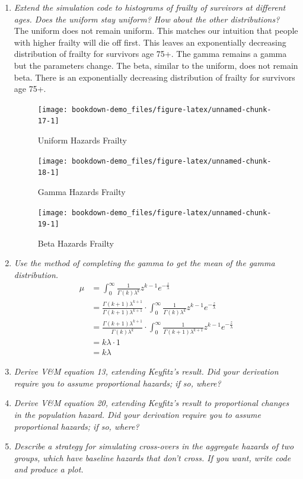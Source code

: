 \documentclass[]{book}
\providecommand{\tightlist}{%
  \setlength{\itemsep}{0pt}\setlength{\parskip}{0pt}}
\begin{document}
\begin{enumerate}
\def\labelenumi{\arabic{enumi}.}
\setcounter{enumi}{7}
\tightlist
\item
  \emph{Extend the simulation code to histograms of frailty of survivors at different ages. Does the uniform stay uniform? How about the other distributions?}\\
  The uniform does not remain uniform. This matches our intuition that people with higher frailty will die off first. This leaves an exponentially decreasing distribution of frailty for survivors age 75+. The gamma remains a gamma but the parameters change. The beta, similar to the uniform, does not remain beta. There is an exponentially decreasing distribution of frailty for survivors age 75+.

  \begin{figure}
  \texttt{[image: bookdown-demo\_files/figure-latex/unnamed-chunk-17-1]} \caption{Uniform Hazards Frailty}\label{fig:unnamed-chunk-17}
  \end{figure}
  \begin{figure}
  \texttt{[image: bookdown-demo\_files/figure-latex/unnamed-chunk-18-1]} \caption{Gamma Hazards Frailty}\label{fig:unnamed-chunk-18}
  \end{figure}
  \begin{figure}
  \texttt{[image: bookdown-demo\_files/figure-latex/unnamed-chunk-19-1]} \caption{Beta Hazards Frailty}\label{fig:unnamed-chunk-19}
  \end{figure}
\item
  \emph{Use the method of completing the gamma to get the mean of the gamma distribution.}\\
  \[\begin{aligned}
  \mu 
  & = \int_0^{\infty} \frac{1}{\Gamma(k) \lambda^k} z^{k - 1} e^{-\frac{z}{\lambda}} \\
  & = \frac{\Gamma(k+1) \lambda^{k+1}}{\Gamma(k+1) \lambda^{k+1}} \cdot \int_0^{\infty} \frac{1}{\Gamma(k) \lambda^k} z^{k - 1} e^{-\frac{z}{\lambda}} \\
  & = \frac{\Gamma(k+1) \lambda^{k+1}}{\Gamma(k) \lambda^{k}} \cdot \int_0^{\infty} \frac{1}{\Gamma(k+1) \lambda^{k+1}} z^{k - 1} e^{-\frac{z}{\lambda}} \\ 
  & = k \lambda \cdot 1 \\
  & = k \lambda
  \end{aligned}\]
\item
  \emph{Derive V\&M equation 13, extending Keyfitz's result. Did your derivation require you to assume proportional hazards; if so, where?}\\
\item
  \emph{Derive V\&M equation 20, extending Keyfitz's result to proportional changes in the population hazard. Did your derivation require you to assume proportional hazards; if so, where?}\\
\item
  \emph{Describe a strategy for simulating cross-overs in the aggregate hazards of two groups, which have baseline hazards that don't cross. If you want, write code and produce a plot.}
\end{enumerate}
\end{document}
